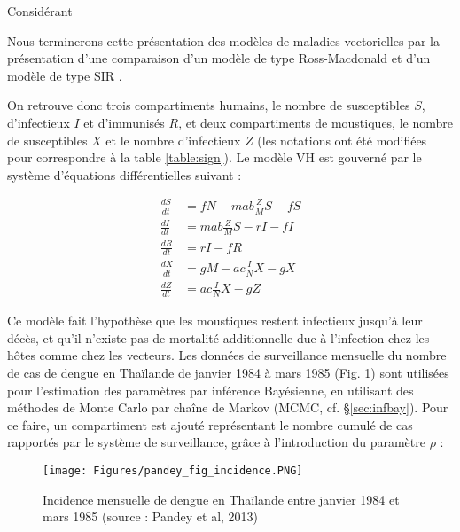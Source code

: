  
Considérant 


Nous terminerons cette présentation des modèles de maladies vectorielles par la présentation d'une comparaison d'un modèle de type Ross-Macdonald et d'un modèle de type SIR \cite{pandey2013comparing}. 


On retrouve donc trois compartiments humains, le nombre de susceptibles $S$, d'infectieux $I$ et d'immunisés $R$, et deux compartiments de moustiques, le nombre de susceptibles $X$ et le nombre d'infectieux $Z$ (les notations ont été modifiées pour correspondre à la table \ref{table:sign}). 
Le modèle VH est gouverné par le système d'équations différentielles suivant :

\begin{align}
\frac{dS}{dt} &= fN - mab\frac{Z}{M}S - fS \\ \nonumber
\frac{dI}{dt} &= mab\frac{Z}{M}S - rI - fI \\ \nonumber
\frac{dR}{dt} &= rI - fR \\  \nonumber
\frac{dX}{dt} &= gM - ac\frac{I}{N}X - gX \\ \nonumber
\frac{dZ}{dt} &= ac\frac{I}{N}X - gZ
\end{align}

\noindent Ce modèle fait l'hypothèse que les moustiques restent infectieux jusqu'à leur décès, et qu'il n'existe pas de mortalité additionnelle due à l'infection chez les hôtes comme chez les vecteurs.
Les données de surveillance mensuelle du nombre de cas de dengue en Thaïlande de janvier 1984 à mars 1985 (Fig. \ref{fig:pandey_figure_incidence}) sont utilisées pour l'estimation des paramètres par inférence Bayésienne, en utilisant des méthodes de Monte Carlo par chaîne de Markov (MCMC, cf. \S \ref{sec:infbay}).
Pour ce faire, un compartiment est ajouté représentant le nombre cumulé de cas rapportés par le système de surveillance, grâce à l'introduction du paramètre $\rho$ :



\begin{figure}[t]
	\centering
	\texttt{[image: Figures/pandey\_fig\_incidence.PNG]}
	\caption{Incidence mensuelle de dengue en Thaïlande entre janvier 1984 et mars 1985 (source : Pandey et al, 2013)}
	\label{fig:pandey_figure_incidence}
\end{figure}



